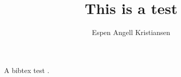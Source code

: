 \documentclass[a4paper,12pt]{report}
\title{This is a test}
\author{Espen Angell Kristiansen}
\date{} %
\begin{document}
\maketitle

A bibtex test \cite{Simula.simula.1124,Simula.simula.1288}.




\end{document}
